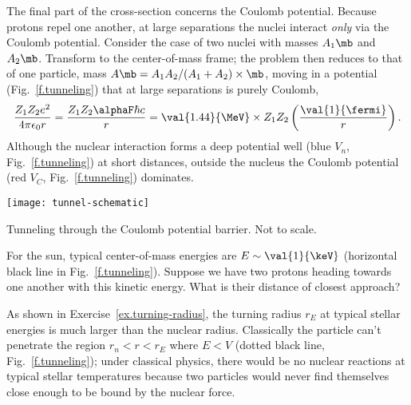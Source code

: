 The final part of the cross-section concerns the Coulomb potential.
Because protons repel one another, at large separations the nuclei interact \emph{only} via the Coulomb potential. Consider the case of two nuclei with masses $A_{1}\mb$ and $A_{2}\mb$. Transform to the center-of-mass frame; the problem then reduces to that of one particle, mass $A\mb = A_{1}A_{2}/(A_{1}+A_{2})\times\mb$, moving in a potential (Fig.~\ref{f.tunneling}) that at large separations is purely Coulomb,
\[ \frac{Z_{1}Z_{2}e^{2}}{4\pi\epsilon_{0}r} = \frac{Z_{1}Z_{2}\alphaF\hbar c}{r} = \val{1.44}{\MeV}\times Z_{1}Z_{2}\left(\frac{\val{1}{\fermi}}{r}\right). \]
Although the nuclear interaction forms a deep potential well (blue $V_{n}$, Fig.~\ref{f.tunneling}) at short distances, outside the nucleus the Coulomb potential (red $V_{C}$, Fig.~\ref{f.tunneling})  dominates.
\begin{marginfigure}[-8\baselineskip]
\texttt{[image: tunnel-schematic]}
\caption[Tunneling through the Coulomb potential barrier]{Tunneling through the Coulomb potential barrier. Not to scale.}
\label{f.tunneling}
\end{marginfigure}

\begin{exercisebox}
\label{ex.turning-radius}
For the sun, typical center-of-mass energies are $E \sim \val{1}{\keV}$ (horizontal black line in Fig.~\ref{f.tunneling}). Suppose we have two protons heading towards one another with this kinetic  energy. What is their distance of closest approach?
\end{exercisebox}

As shown in Exercise~\ref{ex.turning-radius}, the turning radius $r_{E}$ at typical stellar energies is much larger than the nuclear radius.  Classically the particle can't penetrate the region $r_{n} < r < r_{E}$ where $E < V$ (dotted black line, Fig.~\ref{f.tunneling}); under classical physics, there would be no nuclear reactions at typical stellar temperatures because two particles would never find themselves close enough to be bound by the nuclear force.

